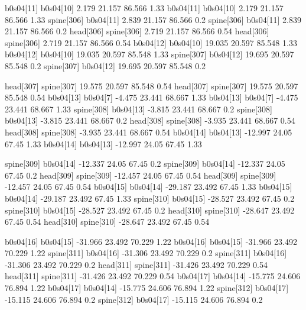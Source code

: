 b0s04[11]    b0s04[10]    2.179    21.157    86.566    1.33
b0s04[11]    b0s04[10]    2.179    21.157    86.566    1.33
spine[306]    b0s04[11]    2.839    21.157    86.566    0.2
spine[306]    b0s04[11]    2.839    21.157    86.566    0.2
head[306]    spine[306]    2.719    21.157    86.566    0.54
head[306]    spine[306]    2.719    21.157    86.566    0.54
b0s04[12]    b0s04[10]    19.035    20.597    85.548    1.33
b0s04[12]    b0s04[10]    19.035    20.597    85.548    1.33
spine[307]    b0s04[12]    19.695    20.597    85.548    0.2
spine[307]    b0s04[12]    19.695    20.597    85.548    0.2


head[307]    spine[307]    19.575    20.597    85.548    0.54
head[307]    spine[307]    19.575    20.597    85.548    0.54
b0s04[13]    b0s04[7]    -4.475    23.441    68.667    1.33
b0s04[13]    b0s04[7]    -4.475    23.441    68.667    1.33
spine[308]    b0s04[13]    -3.815    23.441    68.667    0.2
spine[308]    b0s04[13]    -3.815    23.441    68.667    0.2
head[308]    spine[308]    -3.935    23.441    68.667    0.54
head[308]    spine[308]    -3.935    23.441    68.667    0.54
b0s04[14]    b0s04[13]    -12.997    24.05    67.45    1.33
b0s04[14]    b0s04[13]    -12.997    24.05    67.45    1.33


spine[309]    b0s04[14]    -12.337    24.05    67.45    0.2
spine[309]    b0s04[14]    -12.337    24.05    67.45    0.2
head[309]    spine[309]    -12.457    24.05    67.45    0.54
head[309]    spine[309]    -12.457    24.05    67.45    0.54
b0s04[15]    b0s04[14]    -29.187    23.492    67.45    1.33
b0s04[15]    b0s04[14]    -29.187    23.492    67.45    1.33
spine[310]    b0s04[15]    -28.527    23.492    67.45    0.2
spine[310]    b0s04[15]    -28.527    23.492    67.45    0.2
head[310]    spine[310]    -28.647    23.492    67.45    0.54
head[310]    spine[310]    -28.647    23.492    67.45    0.54


b0s04[16]    b0s04[15]    -31.966    23.492    70.229    1.22
b0s04[16]    b0s04[15]    -31.966    23.492    70.229    1.22
spine[311]    b0s04[16]    -31.306    23.492    70.229    0.2
spine[311]    b0s04[16]    -31.306    23.492    70.229    0.2
head[311]    spine[311]    -31.426    23.492    70.229    0.54
head[311]    spine[311]    -31.426    23.492    70.229    0.54
b0s04[17]    b0s04[14]    -15.775    24.606    76.894    1.22
b0s04[17]    b0s04[14]    -15.775    24.606    76.894    1.22
spine[312]    b0s04[17]    -15.115    24.606    76.894    0.2
spine[312]    b0s04[17]    -15.115    24.606    76.894    0.2


